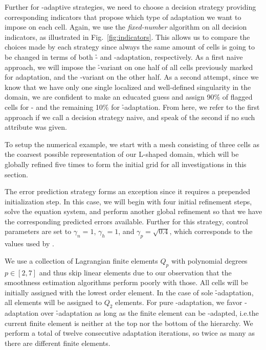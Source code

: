 
Further for \hp-adaptive strategies, we need to choose a decision strategy providing corresponding indicators that propose which type of adaptation we want to impose on each cell.
%
Again, we use the \textit{fixed-number} algorithm on all decision indicators, as illustrated in Fig.~\ref{fig:indicators}. This allows us to compare the choices made by each strategy since always the same amount of cells is going to be changed in terms of both \h- and \p-adaptation, respectively.
%
As a first naive approach, we will impose the \h-variant on one half of all cells previously marked for adaptation, and the \p-variant on the other half.
As a second attempt, since we know that we have only one single localized and well-defined singularity in the domain, we are confident to make an educated guess and assign 90\% of flagged cells for \p- and the remaining 10\% for \h-adaptation. From here, we refer to the first approach if we call a decision strategy naive, and speak of the second if no such attribute was given.

To setup the numerical example, we start with a mesh consisting of three cells as the coarsest possible representation of our L-shaped domain, which will be globally refined five times to form the initial grid for all investigations in this section.

The error prediction strategy forms an exception since it requires a prepended initialization step. In this case, we will begin with four initial refinement steps, solve the equation system, and perform another global refinement so that we have the corresponding predicted errors available. Further for this strategy, control parameters are set to $\gamma_n = 1$, $\gamma_h = 1$, and $\gamma_p = \sqrt{0.4}$, which corresponds to the values used by \textcites{melenk2001}{mitchell2014}.

We use a collection of Lagrangian finite elements $Q_p$ with polynomial degrees $p \in [2,7]$ and thus skip linear elements due to our observation that the smoothness estimation algorithms perform poorly with those. All cells will be initially assigned with the lowest order element. In the case of sole \h-adaptation, all elements will be assigned to $Q_2$ elements. For pure \p-adaptation, we favor \p-adaptation over \h-adaptation as long as the finite element can be \p-adapted, i.e.\@ the current finite element is neither at the top nor the bottom of the hierarchy. We perform a total of twelve consecutive adaptation iterations, so twice as many as there are different finite elements.

